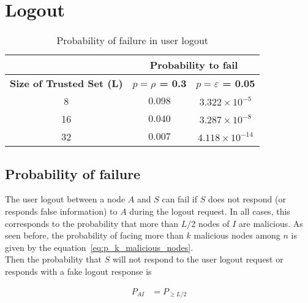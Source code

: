 \section{Logout}
  \label{sec:eval_logout}
  \begin{table}
    \centering
    \footnotesize
    \begin{tabular}{|c|c|c|}
      \cline{2-3}
      \multicolumn{1}{c|}{}&  \multicolumn{2}{c|}{\textbf{Probability to fail}} \\ \cline{2-3}
      \hline
      \textbf{Size of Trusted Set (L)} & \textbf{$p = \rho$ = 0.3} &  \textbf{$p = \varepsilon$ = 0.05} \\
      \hline \hline
      8 &  $0.098$ & $3.322 \times 10^{-5}$ \\
      \hline
      16 & $0.040$ & $3.287 \times 10^{-8}$  \\
      \hline
      32 & $0.007$ & $4.118 \times 10^{-14}$  \\
      \hline
    \end{tabular}
    \caption{Probability of failure in user logout}
    \label{tab:p_logout}
  \end{table}
  
  \subsection{Probability of failure}
    The user logout between a node $A$ and $S$ can fail if $S$ does
not respond (or responds false information) to $A$ during the logout request.
  In all cases, this corresponds to the probability that more than
$L/2$ nodes of $I$ are malicious.
    As seen before, the probability of facing more than $k$ malicious nodes among
$n$ is given by the equation~\ref{eq:p_k_malicious_nodes}.\\

    Then the probability that $S$ will not respond to the user logout 
request or responds with a fake logout response is

    \begin{align}
      P_{AI} &= P_{\ge L/2} 
    \end{align}



